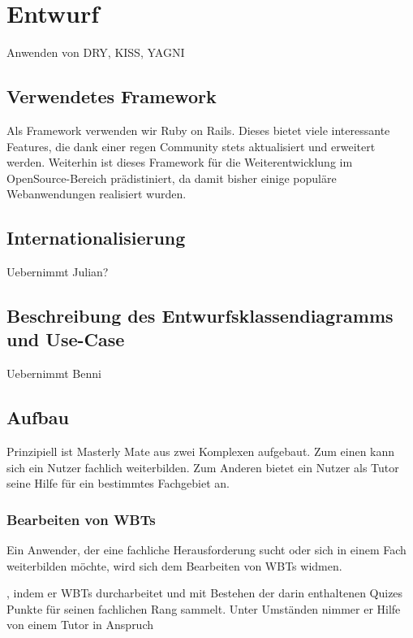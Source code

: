 \chapter{Entwurf}\label{ref:chaptScript}
\begin{k}
Anwenden von DRY, KISS, YAGNI
\end{k}
\section{Verwendetes Framework}
Als Framework verwenden wir Ruby on Rails. Dieses bietet viele interessante
Features, die dank einer regen Community stets aktualisiert und erweitert
werden. Weiterhin ist dieses Framework für die Weiterentwicklung im
OpenSource-Bereich prädistiniert, da damit bisher einige populäre Webanwendungen
realisiert wurden.

\section{Internationalisierung}\label{ref:internationalisierung}
\begin{k}
Uebernimmt Julian?
\end{k}

\section{Beschreibung des Entwurfsklassendiagramms und Use-Case}
\begin{k}
Uebernimmt Benni
\end{k}

\section{Aufbau}
Prinzipiell ist Masterly Mate aus zwei Komplexen aufgebaut. Zum einen kann sich
ein Nutzer fachlich weiterbilden. Zum Anderen bietet ein Nutzer als Tutor seine
Hilfe für ein bestimmtes Fachgebiet an.

\subsection{Bearbeiten von WBTs}
Ein Anwender, der eine fachliche Herausforderung sucht oder sich in einem Fach
weiterbilden möchte, wird sich dem Bearbeiten von WBTs widmen.

\begin{k}
, indem er WBTs durcharbeitet und mit Bestehen
der darin enthaltenen Quizes Punkte für seinen fachlichen Rang sammelt. Unter
Umständen nimmer er Hilfe von einem Tutor in Anspruch
\end{k}
